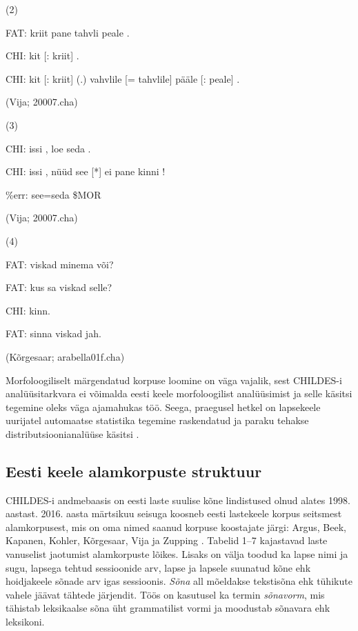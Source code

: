 \documentclass[12pt]{article}
\begin{document}
(2)
\begin{description}
    \item*FAT: kriit pane tahvli peale .
    \item*CHI: kit [: kriit] .
    \item*CHI: kit [: kriit] (.) vahvlile [= tahvlile] pääle [: peale] .
    \item(Vija; 20007.cha)
\end{description}
\hfill

(3)
\begin{description}
    \item*CHI: issi , loe seda .
    \item*CHI: issi , nüüd see [*] ei pane kinni !
    \item\%err: see=seda \$MOR
    \item(Vija; 20007.cha)
\end{description}
\hfill

(4)
\begin{description}
    \item*FAT: viskad minema või?
    \item*FAT: kus sa viskad selle?
    \item*CHI: kinn.
    \item*FAT: sinna viskad jah.
    \item(Kõrgesaar; arabella01f.cha)
\end{description}
\hfill


Morfoloogiliselt märgendatud korpuse loomine on väga vajalik, sest CHILDES-i analüüsitarkvara ei võimalda eesti keele morfoloogilist analüüsimist ja selle käsitsi tegemine oleks väga ajamahukas töö. Seega, praegusel hetkel on lapsekeele uurijatel automaatse statistika tegemine raskendatud ja paraku tehakse distributsioonianalüüse käsitsi \citep[78]{Argus2007}.

\subsection{Eesti keele alamkorpuste struktuur}

CHILDES-i andmebaasis on eesti laste suulise kõne lindistused olnud alates 1998. aastast. 2016. aasta märtsikuu seisuga koosneb eesti lastekeele korpus seitsmest alamkorpusest, mis on oma nimed saanud korpuse koostajate järgi: Argus, Beek, Kapanen, Kohler, Kõrgesaar, Vija ja Zupping \citep{CHILDES}. Tabelid 1--7 kajastavad laste vanuselist jaotumist alamkorpuste lõikes. Lisaks on välja toodud ka lapse nimi ja sugu, lapsega tehtud sessioonide arv, lapse ja lapsele suunatud kõne ehk hoidjakeele sõnade arv igas sessioonis. \emph{Sõna} all mõeldakse tekstisõna ehk tühikute vahele jäävat tähtede järjendit. Töös on kasutusel ka termin \emph{sõnavorm}, mis tähistab leksikaalse sõna üht grammatilist vormi ja moodustab sõnavara ehk leksikoni.
\end{document}
